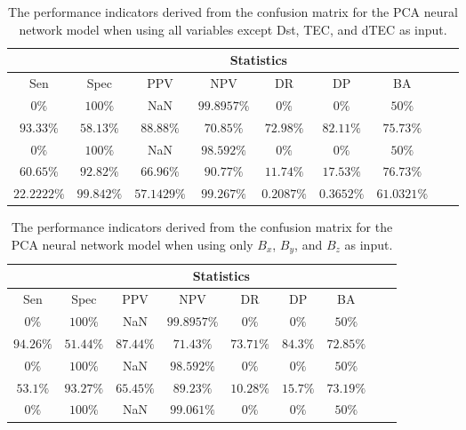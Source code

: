 \begin{table}[!ht]
	\centering
	\begin{tabular}{|c|c|c|c|c|c|c|c|c|}
		\hline
		 & \multicolumn{7}{c|}{Statistics} \\ \hline
		Sen & Spec & PPV & NPV & DR & DP & BA \\ \hline
		$0\%$ & $100\%$ & NaN & $99.8957\%$ & $0\%$ & $0\%$ & $50\%$ \\ \hline
		$93.33\%$ & $58.13\%$ & $88.88\%$ & $70.85\%$ & $72.98\%$ & $82.11\%$ & $75.73\%$ \\ \hline
		$0\%$ & $100\%$ & NaN & $98.592\%$ & $0\%$ & $0\%$ & $50\%$ \\ \hline
		$60.65\%$ & $92.82\%$ & $66.96\%$ & $90.77\%$ & $11.74\%$ & $17.53\%$ & $76.73\%$ \\ \hline
		$22.2222\%$ & $99.842\%$ & $57.1429\%$ & $99.267\%$ & $0.2087\%$ & $0.3652\%$ & $61.0321\%$ \\ \hline
	\end{tabular}
	\caption{The performance indicators derived from the confusion matrix for the PCA neural network model when using all variables except Dst, TEC, and dTEC as input.}
	\label{tab:cs:noTEC:pcaNNet}
\end{table}

\begin{table}[!ht]
	\centering
	\begin{tabular}{|c|c|c|c|c|c|c|c|c|}
		\hline
		 & \multicolumn{7}{c|}{Statistics} \\ \hline
		Sen & Spec & PPV & NPV & DR & DP & BA \\ \hline
		$0\%$ & $100\%$ & NaN & $99.8957\%$ & $0\%$ & $0\%$ & $50\%$ \\ \hline
		$94.26\%$ & $51.44\%$ & $87.44\%$ & $71.43\%$ & $73.71\%$ & $84.3\%$ & $72.85\%$ \\ \hline
		$0\%$ & $100\%$ & NaN & $98.592\%$ & $0\%$ & $0\%$ & $50\%$ \\ \hline
		$53.1\%$ & $93.27\%$ & $65.45\%$ & $89.23\%$ & $10.28\%$ & $15.7\%$ & $73.19\%$ \\ \hline
		$0\%$ & $100\%$ & NaN & $99.061\%$ & $0\%$ & $0\%$ & $50\%$ \\ \hline
	\end{tabular}
	\caption{The performance indicators derived from the confusion matrix for the PCA neural network model when using only $B_{x}$, $B_{y}$, and $B_{z}$ as input.}
	\label{tab:cs:coord:pcaNNet}
\end{table}

